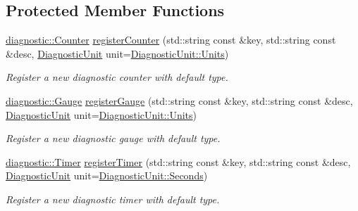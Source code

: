 \subsection*{Protected Member Functions}
\begin{DoxyCompactItemize}
\item 
\hyperlink{namespacevt_1_1diagnostic_a55fcc9d6ffa285d1b085c01df2507d2f}{diagnostic\+::\+Counter} \hyperlink{structvt_1_1runtime_1_1component_1_1_diagnostic_aa2cd54632710e7cdf1b20dfb676c752c}{register\+Counter} (std\+::string const \&key, std\+::string const \&desc, \hyperlink{namespacevt_1_1runtime_1_1component_a99ec18b08862c712176126bb7d0e307a}{Diagnostic\+Unit} unit=\hyperlink{namespacevt_1_1runtime_1_1component_a99ec18b08862c712176126bb7d0e307aae5771a362d88a71a657bfcd21ca54b3f}{Diagnostic\+Unit\+::\+Units})
\begin{DoxyCompactList}\small\item\em Register a new diagnostic counter with default type. \end{DoxyCompactList}\item 
\hyperlink{namespacevt_1_1diagnostic_ad68069af499e2047c28d1852d77680ee}{diagnostic\+::\+Gauge} \hyperlink{structvt_1_1runtime_1_1component_1_1_diagnostic_a20417bbb4fe4c4d7648aef3a2699b787}{register\+Gauge} (std\+::string const \&key, std\+::string const \&desc, \hyperlink{namespacevt_1_1runtime_1_1component_a99ec18b08862c712176126bb7d0e307a}{Diagnostic\+Unit} unit=\hyperlink{namespacevt_1_1runtime_1_1component_a99ec18b08862c712176126bb7d0e307aae5771a362d88a71a657bfcd21ca54b3f}{Diagnostic\+Unit\+::\+Units})
\begin{DoxyCompactList}\small\item\em Register a new diagnostic gauge with default type. \end{DoxyCompactList}\item 
\hyperlink{namespacevt_1_1diagnostic_a84795feb3d3500ee2d7d59248499efb8}{diagnostic\+::\+Timer} \hyperlink{structvt_1_1runtime_1_1component_1_1_diagnostic_a5c6035a56d54cc3de270efedad3f026e}{register\+Timer} (std\+::string const \&key, std\+::string const \&desc, \hyperlink{namespacevt_1_1runtime_1_1component_a99ec18b08862c712176126bb7d0e307a}{Diagnostic\+Unit} unit=\hyperlink{namespacevt_1_1runtime_1_1component_a99ec18b08862c712176126bb7d0e307aa8f19a8c7566af54ea8981029730e5465}{Diagnostic\+Unit\+::\+Seconds})
\begin{DoxyCompactList}\small\item\em Register a new diagnostic timer with default type. \end{DoxyCompactList}\item 

\end{DoxyCompactItemize}

